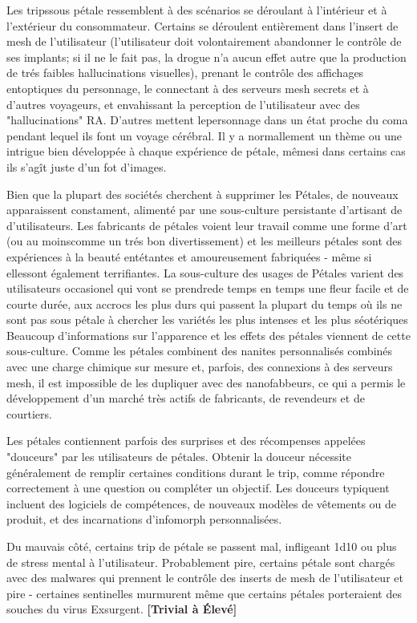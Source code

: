 Les tripssous pétale ressemblent à des scénarios se déroulant à l'intérieur et à l'extérieur du consommateur. Certains se déroulent entièrement dans l'insert de mesh de l'utilisateur (l'utilisateur doit volontairement abandonner le contrôle de ses implants; si il ne le fait pas, la drogue n'a aucun effet autre que la production de trés faibles hallucinations visuelles), prenant le contrôle des affichages entoptiques du personnage, le connectant à des serveurs mesh secrets et à d'autres voyageurs, et envahissant la perception de l'utilisateur avec des "hallucinations" RA. D'autres mettent lepersonnage dans un état proche du coma pendant lequel ils font un voyage cérébral. Il y a normallement un thème ou une intrigue bien développée à chaque expérience de pétale, mêmesi dans certains cas ils s'agît juste d'un fot d'images. 

Bien que la plupart des sociétés cherchent à supprimer les Pétales, de nouveaux apparaissent constament, alimenté par une sous-culture persistante d'artisant de d'utilisateurs. Les fabricants de pétales voient leur travail comme une forme d'art (ou au moinscomme un trés bon divertissement) et les meilleurs pétales sont des expériences à la beauté entétantes et amoureusement fabriquées - même si ellessont également terrifiantes. La sous-culture des usages de Pétales varient des utilisateurs occasionel qui vont se prendrede temps en temps une fleur facile et de courte durée, aux accrocs les plus durs qui passent la plupart du temps où ils ne sont pas sous pétale à chercher les variétés les plus intenses et les plus séotériques Beaucoup d'informations sur l'apparence et les effets des pétales viennent de cette sous-culture. Comme les pétales combinent des nanites personnalisés combinés avec une charge chimique sur mesure et, parfois, des connexions à des serveurs mesh, il est impossible de les dupliquer avec des nanofabbeurs, ce qui a permis le développement d'un marché très actifs de fabricants, de revendeurs et de courtiers. 

Les pétales contiennent parfois des surprises et des récompenses appelées "douceurs" par les utilisateurs de pétales. Obtenir la douceur nécessite généralement de remplir certaines conditions durant le trip, comme répondre correctement à une question ou compléter un objectif. Les douceurs typiquent incluent des logiciels de compétences, de nouveaux modèles de vêtements ou de produit, et des incarnations d'infomorph personnalisées. 

Du mauvais côté, certains trip de pétale se passent mal, infligeant 1d10 ou plus de stress mental à l'utilisateur. Probablement pire, certains pétale sont chargés avec des malwares qui prennent le contrôle des inserts de mesh de l'utilisateur et pire - certaines sentinelles murmurent même que certains pétales porteraient des souches du virus Exsurgent. \textbf{[Trivial à Élevé]} 

